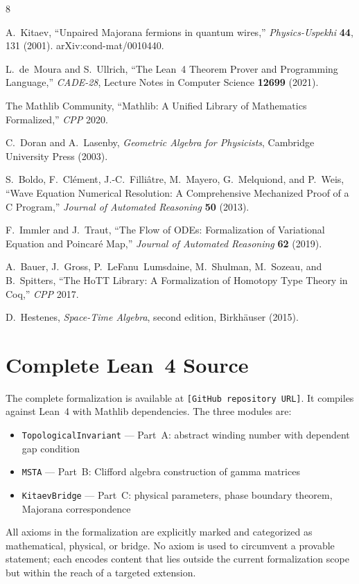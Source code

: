 \documentclass[11pt,a4paper]{article}
\begin{document}
\begin{thebibliography}{8}

A.~Kitaev, ``Unpaired Majorana fermions in quantum wires,'' \textit{Physics-Uspekhi} \textbf{44}, 131 (2001). arXiv:cond-mat/0010440.

L.~de~Moura and S.~Ullrich, ``The Lean~4 Theorem Prover and Programming Language,'' \textit{CADE-28}, Lecture Notes in Computer Science \textbf{12699} (2021).

The Mathlib Community, ``Mathlib: A Unified Library of Mathematics Formalized,'' \textit{CPP} 2020.

C.~Doran and A.~Lasenby, \textit{Geometric Algebra for Physicists}, Cambridge University Press (2003).

S.~Boldo, F.~Cl\'{e}ment, J.-C.~Filli\^{a}tre, M.~Mayero, G.~Melquiond, and P.~Weis, ``Wave Equation Numerical Resolution: A Comprehensive Mechanized Proof of a C Program,'' \textit{Journal of Automated Reasoning} \textbf{50} (2013).

F.~Immler and J.~Traut, ``The Flow of ODEs: Formalization of Variational Equation and Poincar\'{e} Map,'' \textit{Journal of Automated Reasoning} \textbf{62} (2019).

A.~Bauer, J.~Gross, P.~LeFanu~Lumsdaine, M.~Shulman, M.~Sozeau, and B.~Spitters, ``The HoTT Library: A Formalization of Homotopy Type Theory in Coq,'' \textit{CPP} 2017.

D.~Hestenes, \textit{Space-Time Algebra}, second edition, Birkh\"{a}user (2015).

\end{thebibliography}

\appendix
\section{Complete Lean~4 Source}

The complete formalization is available at \texttt{[GitHub repository URL]}. It compiles against Lean~4 with Mathlib dependencies. The three modules are:

\begin{itemize}
    \item \texttt{TopologicalInvariant} --- Part~A: abstract winding number with dependent gap condition
    \item \texttt{MSTA} --- Part~B: Clifford algebra construction of gamma matrices
    \item \texttt{KitaevBridge} --- Part~C: physical parameters, phase boundary theorem, Majorana correspondence
\end{itemize}

All axioms in the formalization are explicitly marked and categorized as mathematical, physical, or bridge. No axiom is used to circumvent a provable statement; each encodes content that lies outside the current formalization scope but within the reach of a targeted extension.
\end{document}
